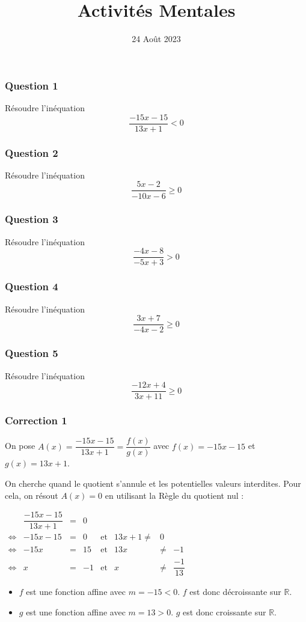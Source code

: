 \documentclass[15pt, mathserif]{beamer}
\title{Activités Mentales}
\date{24 Août 2023}
\begin{document}
\begin{frame}
    \titlepage
\end{frame}

\begin{frame} 
	\frametitle{Question 1}
Résoudre l'inéquation \[ \dfrac{-15x-15}{13x+1}<0\]\end{frame}


\begin{frame} 
	\frametitle{Question 2}
Résoudre l'inéquation \[ \dfrac{5x-2}{-10x-6}\geq0\]\end{frame}


\begin{frame} 
	\frametitle{Question 3}
Résoudre l'inéquation \[ \dfrac{-4x-8}{-5x+3}>0\]\end{frame}


\begin{frame} 
	\frametitle{Question 4}
Résoudre l'inéquation \[ \dfrac{3x+7}{-4x-2}\geq0\]\end{frame}


\begin{frame} 
	\frametitle{Question 5}
Résoudre l'inéquation \[ \dfrac{-12x+4}{3x+11}\geq0\]\end{frame}


\begin{frame}
\vspace{-10mm}
	\frametitle{Correction 1}
\vspace*{1cm} 
  On pose $A(x) = \dfrac{-15x-15}{13x+1} = \dfrac{f(x)}{g(x)}$ avec $f(x) = -15x-15$ et $g(x) = 13x+1$.

 On cherche quand le quotient s'annule et les potentielles valeurs interdites. Pour cela, on résout $A(x)=0$ en utilisant la Règle du quotient nul : 
 
 $\begin{array}{crclcrcl} 
 
 	  & \dfrac{-15x-15}{13x+1} & = & 0 \\ 
 	  \Leftrightarrow & -15x-15 & =& 0 & \text{et} & 13x+1\neq & 0 \\ 
 	 \Leftrightarrow & -15x&=&15& \text{et} & 13x & \neq & -1 \\ 
 	 \Leftrightarrow & x&=&-1 & \text{et} & x &\neq&\dfrac{-1}{13}
 
 \end{array}$ 
 	 \begin{itemize} 
	\item  $f$ est une fonction affine avec $m =-15<0$. $f$ est donc décroissante sur $\mathbb{R}$.
	\item $g$ est une fonction affine avec $m =13>0$. $g$ est donc croissante sur $\mathbb{R}$.

	 \end{itemize}

 \end{frame}
\end{document}
